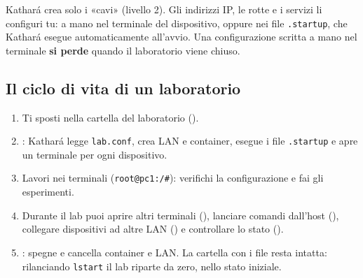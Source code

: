 \begin{attenzione}
Kathará crea solo i «cavi» (livello 2). Gli indirizzi IP, le rotte e i servizi li configuri tu: a mano nel terminale del dispositivo, oppure nei file \texttt{.startup}, che Kathará esegue automaticamente all'avvio. Una configurazione scritta a mano nel terminale \textbf{si perde} quando il laboratorio viene chiuso.
\end{attenzione}

\subsection{Il ciclo di vita di un laboratorio}
\begin{center}
\end{center}
\begin{enumerate}
  \item Ti sposti nella cartella del laboratorio ().
  \item {}: Kathará legge \texttt{lab.conf}, crea LAN e container, esegue i file \texttt{.startup} e apre un terminale per ogni dispositivo.
  \item Lavori nei terminali (\texttt{root@pc1:/\#}): verifichi la configurazione e fai gli esperimenti.
  \item Durante il lab puoi aprire altri terminali (), lanciare comandi dall'host (), collegare dispositivi ad altre LAN () e controllare lo stato ().
  \item {}: spegne e cancella container e LAN. La cartella con i file resta intatta: rilanciando \texttt{lstart} il lab riparte da zero, nello stato iniziale.
\end{enumerate}

